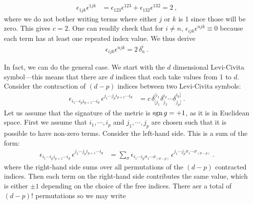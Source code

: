 \begin{subappendices}
\begin{example}
\begin{align}
    \epsilon_{1jk}\epsilon^{1jk}
    &=
    \epsilon_{123}\epsilon^{123}
    +
    \epsilon_{132}\epsilon^{132}
    = 2 \ ,
\end{align}
where we do not bother writing terms where either $j$ or $k$ is 1 since those will be zero. This gives $c=2$. One can readily check that for $i\neq n$, $\epsilon_{ijk}\epsilon^{njk}\equiv 0$ because each term has at least one repeated index value. We thus derive 
\begin{align}
    \epsilon_{ijk}\epsilon^{njk} = 2\, \delta^i_n \ . 
\end{align}
\end{example}

In fact, we can do the general case. We start with the $d$ dimensional Levi-Civita symbol---this means that there are $d$ indices that each take values from 1 to $d$. Consider the contraction of $(d-p)$ indices between two Levi-Civita symbols:
\begin{align}
    \epsilon_{i_1\cdots i_p i_{p+1}\cdots i_d}\,
    \epsilon^{j_1\cdots j_p i_{p+1}\cdots i_d}
    &=
    c\, \delta^{[i_1}_{[j_1}\delta^{i_2}_{j_2} \cdots \delta^{i_p]}_{j_p]} \ .
    \label{eg:product:of:Levi:Civita:general}
\end{align}
Let us assume that the signature of the metric is $\operatorname{\textnormal{sgn}}{g}=+1$, as it is in Euclidean space. First we assume that $i_1, \cdots, i_p$ and $j_1, \cdots, j_p$ are chosen such that it is possible to have non-zero terms. Consider the left-hand side. This is a sum of the form:
\begin{align}
    \epsilon_{i_1\cdots i_p i_{p+1}\cdots i_d}\,
    \epsilon^{j_1\cdots j_p i_{p+1}\cdots i_d}
    &= 
    \sum_\sigma 
    \epsilon_{i_1\cdots i_p \sigma_1\cdots \sigma_{(d-p)}}\,
    \epsilon^{j_1\cdots j_p \sigma_1\cdots \sigma_{(d-p)}}
     \ .
\end{align}
where the right-hand side sums over all permutations of the $(d-p)$ contracted indices. Then each term on the right-hand side contributes the same value, which is either $\pm 1$ depending on the choice of the free indices. There aer a total of $(d-p)!$ permutations so we may write

\end{subappendices}

